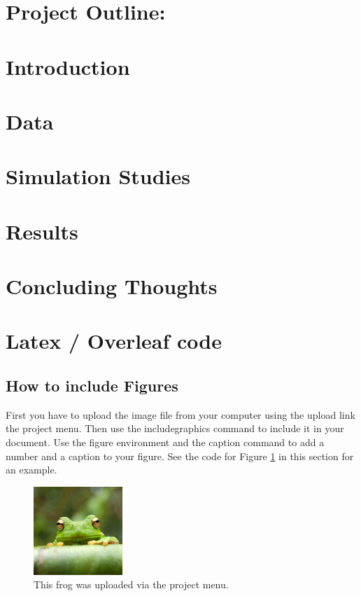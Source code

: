\documentclass[a4paper]{article}
\begin{document}
\newpage
\section*{Project Outline:}
\section{Introduction}

\section{Data}


\section{Simulation Studies}

\section{Results}

\section{Concluding Thoughts}

\newpage 
\section{Latex / Overleaf code}
\subsection{How to include Figures}

First you have to upload the image file from your computer using the upload link the project menu. Then use the includegraphics command to include it in your document. Use the figure environment and the caption command to add a number and a caption to your figure. See the code for Figure \ref{fig:frog} in this section for an example.

\begin{figure}[h!]
\centering
\includegraphics[width=0.3\textwidth]{frog.jpg}
\caption{\label{fig:frog}This frog was uploaded via the project menu.}
\end{figure}
\end{document}
